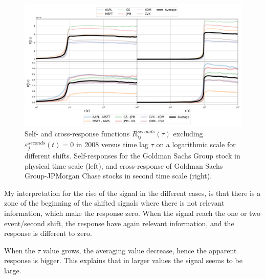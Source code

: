 \begin{figure}[htbp]
    \centering
    \includegraphics[width=\textwidth]{figures/04_shift_responses_physical.png}
    \caption{Self- and cross-response functions
             $R^{seconds}_{ij}\left(\tau\right)$ excluding
             $\varepsilon^{seconds}_{j}\left(t\right) = 0$ in 2008 versus time
             lag $\tau$ on a logarithmic scale for different shifts.
             Self-responses for the Goldman Sachs Group stock in physical time
             scale (left), and cross-response of Goldman Sachs Group-JPMorgan
             Chase stocks in second time scale (right).}
    \label{fig:shift_responses_physical_scale}
\end{figure}

My interpretation for the rise of the signal in the different cases, is that there is a zone of the
beginning of the shifted signals where there is not relevant information, which make the response
zero. When the signal reach the one or two event/second shift, the response have again relevant
information, and the response is different to zero.

When the $\tau$ value grows, the averaging value decrease, hence the apparent response is bigger.
This explains that in larger values the signal seems to be large.
